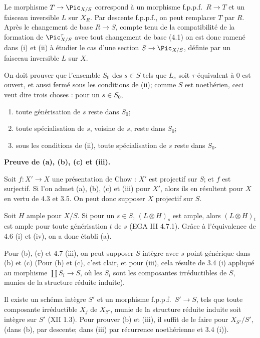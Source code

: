 Le morphisme $T \to \Pic_{X/S}$ correspond \`a un morphisme f.p.p.f.\ $R \to T$ et un faisceau inversible $L$ sur $X_R$. Par descente f.p.p.f., on peut remplacer $T$ par $R$. Apr\`es le changement de base $R \to S$, compte tenu de la compatibilit\'e de la formation de $\Pic^{\tau}_{X/S}$ avec tout changement de base (4.1) on est donc ramen\'e dans (i) et (ii) \`a \'etudier le cas d'une section $S \to \Pic_{X/S}$, d\'efinie par un faisceau inversible $L$ sur $X$.

On doit prouver que l'ensemble $S_0$ des $s \in S$ tels que $L_s$ soit $\tau$-\'equivalent \`a $0$ est ouvert, et aussi ferm\'e sous les conditions de (ii); comme $S$ est noeth\'erien, ceci veut dire trois choses : pour un $s \in S_0$,

\begin{enumerate}[label=(\alph*)]
\item toute g\'en\'erisation de $s$ reste dans $S_0$;
\item toute sp\'ecialisation de $s$, voisine de $s$, reste dans $S_0$;
\item sous les conditions de (ii), toute sp\'ecialisation de $s$ reste dans $S_0$.
\end{enumerate}

\medskip
\noindent\textbf{Preuve de (a), (b), (c) et (iii).}

Soit $f : X' \to X$ une pr\'esentation de Chow : $X'$ est projectif sur $S$; et $f$ est surjectif. Si l'on admet (a), (b), (c) et (iii) pour $X'$, alors ils en r\'esultent pour $X$ en vertu de 4.3 et 3.5. On peut donc supposer $X$ projectif sur $S$.

Soit $H$ ample pour $X/S$. Si pour un $s \in S$, $(L \otimes H)_s$ est ample, alors $(L \otimes H)_t$ est ample pour toute g\'en\'erisation $t$ de $s$ (EGA III 4.7.1). Gr\^ace \`a l'\'equivalence de 4.6 (i) et (iv), on a donc \'etabli (a).

Pour (b), (c) et 4.7 (iii), on peut supposer $S$ int\`egre avec $s$ point g\'en\'erique dans (b) et (c) (Pour (b) et (c), c'est clair, et pour (iii), cela r\'esulte de 3.4 (i) appliqu\'e au morphisme $\coprod S_i \to S$, o\`u les $S_i$ sont les composantes irr\'eductibles de $S$, munies de la structure r\'eduite induite).

Il existe un sch\'ema int\`egre $S'$ et un morphisme f.p.p.f.\ $S' \to S$, tels que toute composante irr\'eductible $X_j$ de $X_{S'}$, munie de la structure r\'eduite induite soit int\`egre sur $S'$ (XII 1.3). Pour prouver (b) et (iii), il suffit de le faire pour $X_{S'}/S'$, (dans (b), par descente; dans (iii) par r\'ecurrence noeth\'erienne et 3.4 (i)).

